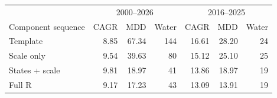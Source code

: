 \begin{tabular}{@{}lrrrrrr@{}}\toprule
 & \multicolumn{3}{c}{2000--2026} & \multicolumn{3}{c}{2016--2025}\\
Component sequence & CAGR & MDD & Water & CAGR & MDD & Water\\\midrule
Template & 8.85 & 67.34 & 144 & 16.61 & 28.20 & 24\\
Scale only & 9.54 & 39.63 & 80 & 15.12 & 25.10 & 25\\
States + scale & 9.81 & 18.97 & 41 & 13.86 & 18.97 & 19\\
Full R & 9.17 & 17.23 & 43 & 13.09 & 13.91 & 19\\
\bottomrule
\end{tabular}
